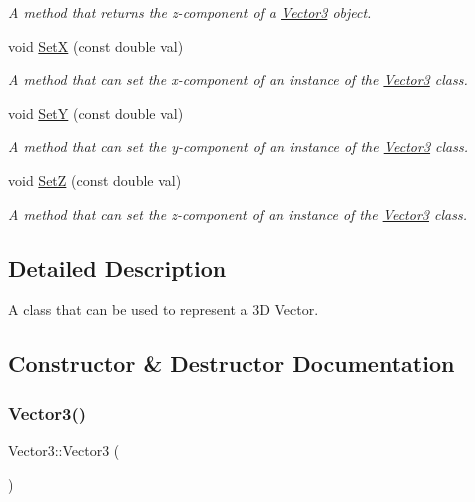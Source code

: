 \begin{DoxyCompactItemize}
\begin{DoxyCompactList}\small\item\em A method that returns the z-\/component of a \hyperlink{classVector3}{Vector3} object. \end{DoxyCompactList}\item 
void \hyperlink{classVector3_a11008100f53bc216fa17e3f80fd8e26e}{SetX} (const double val)
\begin{DoxyCompactList}\small\item\em A method that can set the x-\/component of an instance of the \hyperlink{classVector3}{Vector3} class. \end{DoxyCompactList}\item 
void \hyperlink{classVector3_a93488ef1d624926521480f5d45270e5d}{SetY} (const double val)
\begin{DoxyCompactList}\small\item\em A method that can set the y-\/component of an instance of the \hyperlink{classVector3}{Vector3} class. \end{DoxyCompactList}\item 
void \hyperlink{classVector3_a69c1d50b5ec7c02d4d8ecfc19030e996}{SetZ} (const double val)
\begin{DoxyCompactList}\small\item\em A method that can set the z-\/component of an instance of the \hyperlink{classVector3}{Vector3} class. \end{DoxyCompactList}\end{DoxyCompactItemize}


\subsection{Detailed Description}
A class that can be used to represent a 3D Vector. 

\subsection{Constructor \& Destructor Documentation}
\mbox{\label{classVector3_a0f49191f7e001e7f7ae1cb49522118b4}} 
\subsubsection{\texorpdfstring{Vector3()}{Vector3()}\hspace{0.1cm}{\footnotesize\ttfamily [1/2]}}
{\footnotesize\ttfamily Vector3\+::\+Vector3 (\begin{DoxyParamCaption}{ }\end{DoxyParamCaption})}



